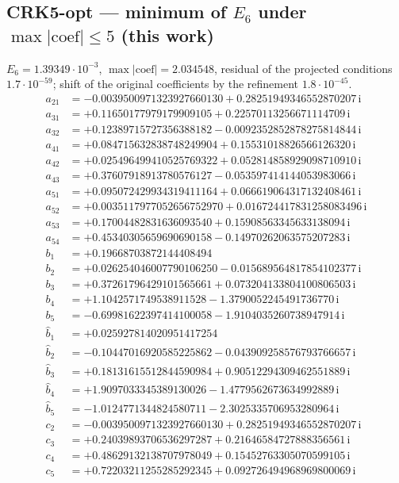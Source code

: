 \subsection*{CRK5-opt --- minimum of $E_6$ under $\max|\text{coef}|\le5$ (this work)}
$E_{6}=1.39349\cdot10^{-3}$, $\max|\text{coef}|=2.034548$, residual of the projected conditions $1.7\cdot10^{-59}$; shift of the original coefficients by the refinement $1.8\cdot10^{-45}$. 
{\small\allowdisplaybreaks
\begin{align*}
a_{21} &= -0.0039500971323927660130 + 0.28251949346552870207\,\mathrm{i}\\
a_{31} &= +0.11650177979179909105 + 0.22570113256671114709\,\mathrm{i}\\
a_{32} &= +0.12389715727356388182 - 0.0092352852878275814844\,\mathrm{i}\\
a_{41} &= +0.084715632838748249904 + 0.15531018826566126320\,\mathrm{i}\\
a_{42} &= +0.025496499410525769322 + 0.052814858929098710910\,\mathrm{i}\\
a_{43} &= +0.37607918913780576127 - 0.053597414144053983066\,\mathrm{i}\\
a_{51} &= +0.095072429934319411164 + 0.066619064317132408461\,\mathrm{i}\\
a_{52} &= +0.0035117977052656752970 + 0.016724417831258083496\,\mathrm{i}\\
a_{53} &= +0.17004482831636093540 + 0.15908563345633138094\,\mathrm{i}\\
a_{54} &= +0.45340305659690690158 - 0.14970262063575207283\,\mathrm{i}\\[1mm]
b_{1} &= +0.19668703872144408494\\
b_{2} &= +0.026254046007790106250 - 0.015689564817854102377\,\mathrm{i}\\
b_{3} &= +0.37261796429101565661 + 0.073204133804100806503\,\mathrm{i}\\
b_{4} &= +1.1042571749538911528 - 1.3790052245491736770\,\mathrm{i}\\
b_{5} &= -0.69981622397414100058 - 1.9104035260738947914\,\mathrm{i}\\[1mm]
\hat b_{1} &= +0.025927814020951417254\\
\hat b_{2} &= -0.10447016920585225862 - 0.043909258576793766657\,\mathrm{i}\\
\hat b_{3} &= +0.18131615512844590984 + 0.90512294309462551889\,\mathrm{i}\\
\hat b_{4} &= +1.9097033345389130026 - 1.4779562673634992889\,\mathrm{i}\\
\hat b_{5} &= -1.0124771344824580711 - 2.3025335706953280964\,\mathrm{i}\\[1mm]
c_{2} &= -0.0039500971323927660130 + 0.28251949346552870207\,\mathrm{i}\\
c_{3} &= +0.24039893706536297287 + 0.21646584727888356561\,\mathrm{i}\\
c_{4} &= +0.48629132138707978049 + 0.15452763305070599105\,\mathrm{i}\\
c_{5} &= +0.72203211255285292345 + 0.092726494968969800069\,\mathrm{i}
\end{align*}
}

